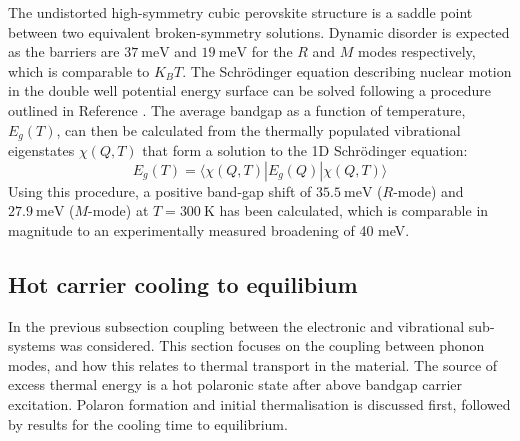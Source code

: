 \begin{table}
The undistorted high-symmetry cubic perovskite structure is a saddle point between two equivalent broken-symmetry solutions. Dynamic disorder is expected as the barriers are $37\ \textrm{meV}$ and $19\ \textrm{meV}$ for the $R$ and $M$ modes respectively, which is comparable to $K_BT$. 
The Schr\"{o}dinger equation describing nuclear motion in the double well potential energy surface can be solved following a procedure outlined in Reference \cite{Skelton2016a}. %
The average bandgap as a function of temperature, $E_g(T)$, can then be calculated from the thermally populated vibrational eigenstates $\chi(Q,T)$ that form a solution to the 1D Schr\"{o}dinger equation:
\begin{equation}
E_g(T) = \langle \chi(Q,T)|E_g(Q)|\chi(Q,T) \rangle
\end{equation}
Using this procedure, a positive band-gap shift of $35.5\ \textrm{meV}$ ($R$-mode) and $27.9\ \textrm{meV}$ ($M$-mode) at $T=300\ \textrm{K}$ has been calculated, which is comparable in magnitude to an experimentally measured broadening of 40 meV.\autocite{Wright2016} 

\subsection{Hot carrier cooling to equilibium} \label{ch5:epcoupling}
In the previous subsection coupling between the electronic and vibrational sub-systems was considered. This section focuses on the coupling between phonon modes, and how this relates to thermal transport in the material. The source of excess thermal energy is a hot polaronic state after above bandgap carrier excitation. Polaron formation and initial thermalisation is discussed first, followed by results for the cooling time to equilibrium.


\end{table}
